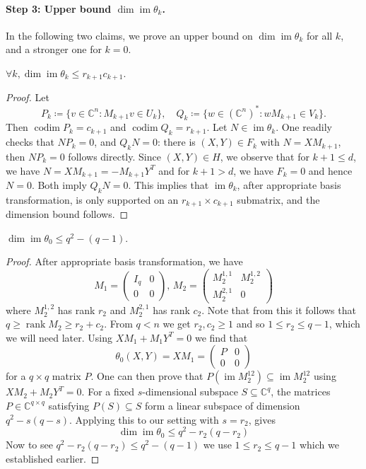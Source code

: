 \documentclass[11pt,a4paper]{article}
\numberwithin{equation}{section}
\newcommand{\CC}{\mathbb{C}}
\DeclareMathOperator{\codim}{codim}
\DeclareMathOperator{\rank}{rank}
\DeclareMathOperator{\im}{im}
\begin{document}
\paragraph{Step 3: Upper bound $\dim \im \theta_k$.}
In the following two claims, we prove an upper bound on  $\dim \im \theta_k$ for all $k$, and a stronger one for $k=0$.
\begin{claim}\label{claim:1}
	$\forall k, \dim \im \theta_k \leq r_{k+1} c_{k+1}$.
\end{claim}
\begin{proof}
Let
\[
P_k \coloneqq \{ v \in \CC^n : M_{k+1} v \in U_k\},\quad Q_k \coloneqq \{w \in (\CC^n)^* : w M_{k+1} \in V_k\}.
\]
Then $\codim P_k = c_{k+1}$ and $\codim Q_k = r_{k+1}$.
Let $N \in \im \theta_k$. One readily checks that $N P_k = 0$, and $Q_k N = 0$: there is $(X,Y) \in F_k$ with $N=XM_{k+1}$, then $NP_k=0$ follows directly. Since $(X,Y) \in H$, we observe that for $k+1 \leq d$, we have $N=XM_{k+1}=-M_{k+1}Y^T$ and for $k+1 >d$, we have $F_k=0$ and hence $N=0$. Both imply $Q_kN=0$. This implies that $\im \theta_k$, after appropriate basis transformation, is only supported on an $r_{k+1} \times c_{k+1}$ submatrix, and the dimension bound follows.
\end{proof}

\begin{claim}\label{claim:2}
	$\dim \im \theta_0 \leq q^2 - (q-1)$.
\end{claim}
\begin{proof}
After appropriate basis transformation, we have
\[
M_1 = 
\begin{pmatrix}
I_q & 0 \\
0 & 0
\end{pmatrix},\,
M_2 = \begin{pmatrix}
M_2^{1,1} & M_2^{1,2}\\
M_2^{2,1} & 0
\end{pmatrix}
\]
where $M_2^{1,2}$ has rank $r_2$ and $M_2^{2,1}$ has rank $c_2$. Note that from this it follows that $q \geq \rank M_2 \geq r_2 + c_2$. From $q<n$ we get $r_2, c_2 \geq 1$ and so $1 \leq r_2 \leq q-1$, which we will need later. Using $XM_1 + M_1 Y^T = 0$ we find that 
\[
\theta_0(X,Y) = XM_1 = \begin{pmatrix}
	P & 0\\
	0 & 0
\end{pmatrix}
\]
for a $q\times q$ matrix $P$. One can then prove that $P( \im M_2^{12} ) \subseteq \im M_2^{12}$ using $XM_2+M_2Y^T=0$. For a fixed $s$-dimensional subspace $S \subseteq \CC^q$, the matrices $P \in \CC^{q \times q}$ satisfying $P(S) \subseteq S$ form a linear subspace of dimension $q^2 - s(q-s)$. Applying this to our setting with $s = r_2$, gives
\[
\dim \im \theta_0 \leq q^2 - r_2(q-r_2)
\]
Now to see $q^2 - r_2(q-r_2) \leq q^2 - (q-1)$ we use $1 \leq r_2 \leq q-1$ which we established earlier.
\end{proof}
\end{document}
